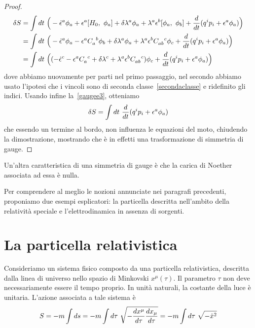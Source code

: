 \begin{proof}
    \begin{equation*}
    \begin{aligned}
        \delta S & = \int dt ~ \Big (- \dot \epsilon^a \phi_a + \epsilon^a \poi{H_0}{\phi_a} + \delta \lambda^a \phi_a + \lambda^a \epsilon^b \poi{\phi_a}{\phi_b} + \dv{}{t} (q^i p_i + \epsilon^a \phi_a) \Big ) \\ & = \int dt ~ \Big (- \dot \epsilon^a \phi_a - \epsilon^a  C_a^{\phantom a b} \phi_b + \delta \lambda^a \phi_a + \lambda^a \epsilon^b C_{ab}^{\phantom{ab} c} \phi_c + \dv{}{t} (q^i p_i + \epsilon^a \phi_a) \Big ) \\ & = \int dt ~ \Big ((- \dot \epsilon^c - \epsilon^a  C_a^{\phantom a c} + \delta \lambda^c + \lambda^a \epsilon^b C_{ab}^{\phantom{ab} c} )\phi_c + \dv{}{t} (q^i p_i + \epsilon^a \phi_a) \Big ) 
    \end{aligned}
    \end{equation*}
    dove abbiamo nuovamente per parti nel primo passaggio, nel secondo abbiamo usato l'ipotesi che i vincoli sono di seconda classe~\eqref{secondaclasse} e ridefinito gli indici. Usando infine la~\eqref{gaugee3}, otteniamo
    \begin{equation*}
       \delta S = \int dt ~ \frac{d}{dt} (q^i p_i + \epsilon^a \phi_a)
    \end{equation*}
    che essendo un termine al bordo, non influenza le equazioni del moto, chiudendo la dimostrazione, mostrando che è in effetti una trasformazione di simmetria di gauge.
    \end{proof}

    Un'altra caratteristica di una simmetria di gauge è che la carica di Noether associata ad essa è nulla.

    \hfill

    Per comprendere al meglio le nozioni annunciate nei paragrafi precedenti, proponiamo due esempi esplicatori: la particella descritta nell'ambito della relatività speciale e l'elettrodinamica in assenza di sorgenti. 

\section{La particella relativistica}

    Consideriamo un sistema fisico composto da una particella relativistica, descritta dalla linea di universo nello spazio di Minkovski $x^\mu(\tau)$. Il parametro $\tau$ non deve necessariamente essere il tempo proprio. In unità naturali, la costante della luce è unitaria. L'azione associata a tale sistema è
    \begin{equation} \label{azionerel}
        S = - m \int ds = - m \int d\tau ~ \sqrt{- \frac{dx^\mu}{d\tau}\frac{dx_\mu}{d\tau}} = - m \int d\tau ~ \sqrt{- \dot x^2}
    \end{equation}
    
